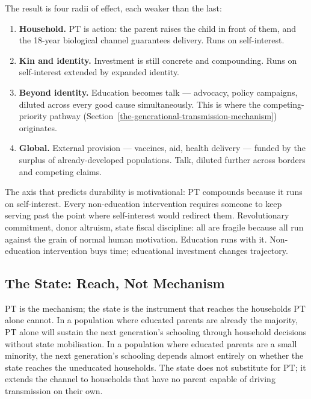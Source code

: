 \documentclass[12pt,letterpaper]{article}
\begin{document}
The result is four radii of effect, each weaker than the last:

\begin{enumerate}
\item \textbf{Household.} PT is action: the parent raises the child in
front of them, and the 18-year biological channel guarantees delivery.
Runs on self-interest.

\item \textbf{Kin and identity.} Investment is still concrete and
compounding. Runs on self-interest extended by expanded identity.

\item \textbf{Beyond identity.} Education becomes talk --- advocacy,
policy campaigns, diluted across every good cause simultaneously.
This is where the competing-priority pathway
(Section~\ref{the-generational-transmission-mechanism}) originates.

\item \textbf{Global.} External provision --- vaccines, aid, health
delivery --- funded by the surplus of already-developed populations.
Talk, diluted further across borders and competing claims.
\end{enumerate}

The axis that predicts durability is motivational: PT compounds because
it runs on self-interest. Every non-education intervention requires
someone to keep serving past the point where self-interest would redirect
them. Revolutionary commitment, donor altruism, state fiscal discipline:
all are fragile because all run against the grain of normal human
motivation. Education runs with it. Non-education intervention buys
time; educational investment changes trajectory.

\subsection{The State: Reach, Not Mechanism}\label{the-state-reach-not-mechanism}

PT is the mechanism; the state is the instrument that reaches the
households PT alone cannot. In a population where educated parents
are already the majority, PT alone will sustain the next generation's
schooling through household decisions without state mobilisation. In
a population where educated parents are a small minority, the next
generation's schooling depends almost entirely on whether the state
reaches the uneducated households. The state does not substitute for
PT; it extends the channel to households that have no parent capable
of driving transmission on their own.
\end{document}
